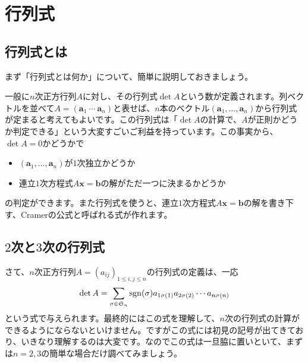 \chapter{行列式}

\section{行列式とは}

まず「行列式とは何か」について、簡単に説明しておきましょう。

一般に$n$次正方行列$A$に対し、その行列式$\det A$という数が定義されます。列ベクトルを並べて$A = (\bm{a}_1 \ \cdots \ \bm{a}_n)$と表せば、$n$本のベクトル$(\bm{a}_1, \ldots, \bm{a}_n)$から行列式が定まると考えてもよいです。この行列式は「$\det A$の計算で、$A$が正則かどうか判定できる」という大変すごいご利益を持っています。この事実から、$\det A = 0$かどうかで
\begin{itemize}
\item $(\bm{a}_1, \ldots, \bm{a}_n)$が$1$次独立かどうか
\item 連立$1$次方程式$A\bm{x} = \bm{b}$の解がただ一つに決まるかどうか
\end{itemize}
の判定ができます。また行列式を使うと、連立$1$次方程式$A\bm{x} = \bm{b}$の解を書き下す、Cramerの公式と呼ばれる式が作れます。

\section{$2$次と$3$次の行列式}

さて、$n$次正方行列$A = (a_{ij})_{1\leq i, j\leq n}$の行列式の定義は、一応
\[
\det A = \sum_{\sigma \in \mathfrak{S}_n} \operatorname{sgn}(\sigma) a_{1 \sigma(1)} a_{2 \sigma(2)} \cdots a_{n \sigma(n)}
\]
という式で与えられます。最終的にはこの式を理解して、$n$次の行列式の計算ができるようにならないといけません。ですがこの式には初見の記号が出てきており、いきなり理解するのは大変です。なのでこの式は一旦脇に置いといて、まずは$n = 2, 3$の簡単な場合だけ調べてみましょう。

